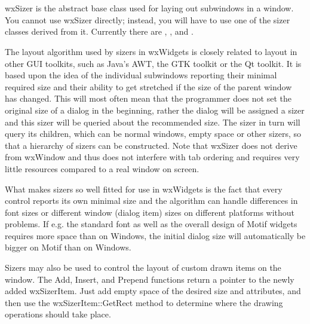 \section{}\label{wxsizer}

wxSizer is the abstract base class used for laying out subwindows in a window. You
cannot use wxSizer directly; instead, you will have to use one of the sizer
classes derived from it. Currently there are , 
,
 and .

The layout algorithm used by sizers in wxWidgets is closely related to layout
in other GUI toolkits, such as Java's AWT, the GTK toolkit or the Qt toolkit. It is
based upon the idea of the individual subwindows reporting their minimal required
size and their ability to get stretched if the size of the parent window has changed.
This will most often mean that the programmer does not set the original size of
a dialog in the beginning, rather the dialog will be assigned a sizer and this sizer
will be queried about the recommended size. The sizer in turn will query its
children, which can be normal windows, empty space or other sizers, so that
a hierarchy of sizers can be constructed. Note that wxSizer does not derive from wxWindow
and thus does not interfere with tab ordering and requires very little resources compared
to a real window on screen.

What makes sizers so well fitted for use in wxWidgets is the fact that every control
reports its own minimal size and the algorithm can handle differences in font sizes
or different window (dialog item) sizes on different platforms without problems. If e.g.
the standard font as well as the overall design of Motif widgets requires more space than
on Windows, the initial dialog size will automatically be bigger on Motif than on Windows.

Sizers may also be used to control the layout of custom drawn items on the window.  The
Add, Insert, and Prepend functions return a pointer to the newly added wxSizerItem. Just
add empty space of the desired size and attributes, and then use the wxSizerItem::GetRect
method to determine where the drawing operations should take place.



